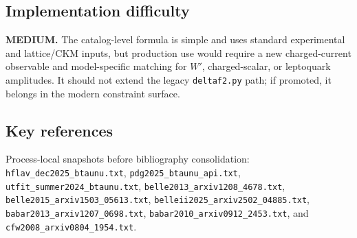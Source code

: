 \subsection*{Implementation difficulty}
\textbf{MEDIUM.}  The catalog-level formula is simple and uses standard
experimental and lattice/CKM inputs, but production use would require a new
charged-current observable and model-specific matching for \(W'\),
charged-scalar, or leptoquark amplitudes.  It should not extend the legacy
\texttt{deltaf2.py} path; if promoted, it belongs in the modern constraint
surface.

\subsection*{Key references}
Process-local snapshots before bibliography consolidation:
\texttt{hflav\_dec2025\_btaunu.txt},
\texttt{pdg2025\_btaunu\_api.txt},
\texttt{utfit\_summer2024\_btaunu.txt},
\texttt{belle2013\_arxiv1208\_4678.txt},
\texttt{belle2015\_arxiv1503\_05613.txt},
\texttt{belleii2025\_arxiv2502\_04885.txt},
\texttt{babar2013\_arxiv1207\_0698.txt},
\texttt{babar2010\_arxiv0912\_2453.txt}, and
\texttt{cfw2008\_arxiv0804\_1954.txt}.

